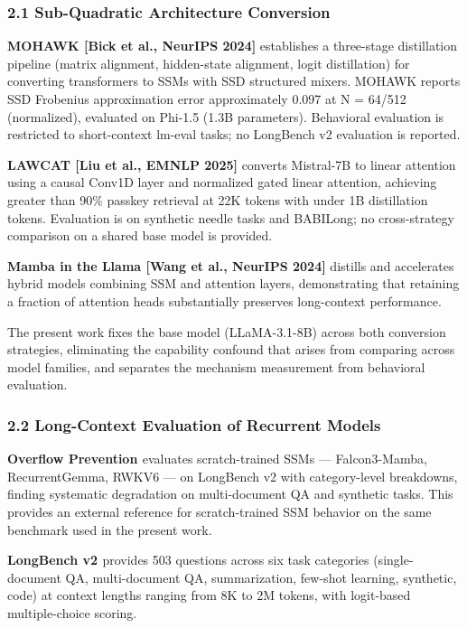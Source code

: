 
\subsubsection{2.1 Sub-Quadratic Architecture Conversion}

\textbf{MOHAWK [Bick et al., NeurIPS 2024]} establishes a three-stage distillation pipeline (matrix alignment, hidden-state alignment, logit distillation) for converting transformers to SSMs with SSD structured mixers. MOHAWK reports SSD Frobenius approximation error approximately 0.097 at N = 64/512 (normalized), evaluated on Phi-1.5 (1.3B parameters). Behavioral evaluation is restricted to short-context lm-eval tasks; no LongBench v2 evaluation is reported.

\textbf{LAWCAT [Liu et al., EMNLP 2025]} converts Mistral-7B to linear attention using a causal Conv1D layer and normalized gated linear attention, achieving greater than 90\% passkey retrieval at 22K tokens with under 1B distillation tokens. Evaluation is on synthetic needle tasks and BABILong; no cross-strategy comparison on a shared base model is provided.

\textbf{Mamba in the Llama [Wang et al., NeurIPS 2024]} distills and accelerates hybrid models combining SSM and attention layers, demonstrating that retaining a fraction of attention heads substantially preserves long-context performance.

The present work fixes the base model (LLaMA-3.1-8B) across both conversion strategies, eliminating the capability confound that arises from comparing across model families, and separates the mechanism measurement from behavioral evaluation.

\subsubsection{2.2 Long-Context Evaluation of Recurrent Models}

\textbf{Overflow Prevention \citep{BenKish2025}} evaluates scratch-trained SSMs --- Falcon3-Mamba, RecurrentGemma, RWKV6 --- on LongBench v2 with category-level breakdowns, finding systematic degradation on multi-document QA and synthetic tasks. This provides an external reference for scratch-trained SSM behavior on the same benchmark used in the present work.

\textbf{LongBench v2 \citep{Bai2024}} provides 503 questions across six task categories (single-document QA, multi-document QA, summarization, few-shot learning, synthetic, code) at context lengths ranging from 8K to 2M tokens, with logit-based multiple-choice scoring.

